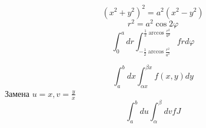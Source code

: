\begin{exercise}
    \[(x^2 + y^2)^2 = a^2(x^2 - y^2)\]
    \[r^2 = a^2 \cos 2\varphi\]
    \[\int_0^a dr \int_{ - \frac{1}{2} \arccos \frac{r^2}{a^2} }^{ \frac{1}{2} \arccos \frac{r^2}{a^2} } f r d\varphi\]
\end{exercise}

\begin{exercise}[3957]
    \[\int_a^b dx \int_{\alpha x}^{\beta x} f(x, y) dy\]
    Замена \(u = x, v = \frac{y}{x}\)
    \[\int_a^b du \int_{\alpha}^{\beta} dv f J\]
\end{exercise}


